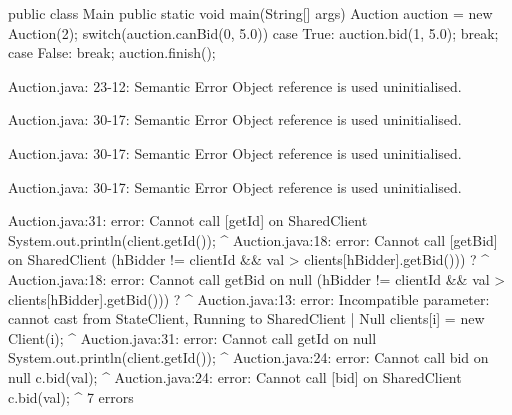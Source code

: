 \begin{code}
public class Main {
  public static void main(String[] args) {
    Auction auction = new Auction(2);
    switch(auction.canBid(0, 5.0)){
      case True:
        auction.bid(1, 5.0);
        break;
      case False:
        break;
    }
    auction.finish();
  }
}\end{code}

\lstset{language=,caption=Mungo's output}
\begin{code}

Auction.java: 23-12: Semantic Error
		Object reference is used uninitialised.

Auction.java: 30-17: Semantic Error
		Object reference is used uninitialised.

Auction.java: 30-17: Semantic Error
		Object reference is used uninitialised.

Auction.java: 30-17: Semantic Error
		Object reference is used uninitialised.
\end{code}

\lstset{language=,caption=Our tool's output}
\begin{code}
Auction.java:31: error: Cannot call [getId] on Shared{Client}
      System.out.println(client.getId());
                                     ^
Auction.java:18: error: Cannot call [getBid] on Shared{Client}
           (hBidder != clientId && val > clients[hBidder].getBid())) ?
                                                                ^
Auction.java:18: error: Cannot call getBid on null
           (hBidder != clientId && val > clients[hBidder].getBid())) ?
                                                         ^
Auction.java:13: error: Incompatible parameter: cannot cast from State{Client, Running} to Shared{Client} | Null
      clients[i] = new Client(i);
                   ^
Auction.java:31: error: Cannot call getId on null
      System.out.println(client.getId());
                               ^
Auction.java:24: error: Cannot call bid on null
    c.bid(val);
     ^
Auction.java:24: error: Cannot call [bid] on Shared{Client}
    c.bid(val);
         ^
7 errors
\end{code}

